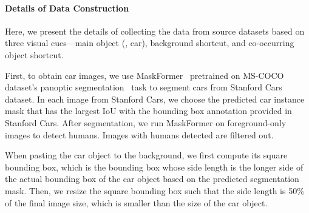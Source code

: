 \documentclass[10pt,twocolumn,letterpaper]{article}
\begin{document}
\paragraph{Details of Data Construction} Here, we present the details of collecting the data from source datasets based on three visual cues---main object (\ie, car), background shortcut, and co-occurring object shortcut.

First, to obtain car images, we use MaskFormer~\cite{cheng2021Adv.NeuralInf.Process.Syst.PerPixel} pretrained on MS-COCO~\cite{lin2014Eur.Conf.Comput.Vis.ECCVMicrosoft} dataset's panoptic segmentation~\cite{kirillov2019IEEECVFConf.Comput.Vis.PatternRecognit.CVPRPanoptic} task to segment cars from Stanford Cars~\cite{krause2013IEEEInt.Conf.Comput.Vis.Workshop3D} dataset. In each image from Stanford Cars, we choose the predicted car instance mask that has the largest IoU with the bounding box annotation provided in Stanford Cars. After segmentation, we run MaskFormer on foreground-only images to detect humans. Images with humans detected are filtered out.

When pasting the car object to the background, we first compute its square bounding box, which is the bounding box whose side length is the longer side of the actual bounding box of the car object based on the predicted segmentation mask. Then, we resize the square bounding box such that the side length is 50\% of the final image size, which is smaller than the size of the car object.
\end{document}
